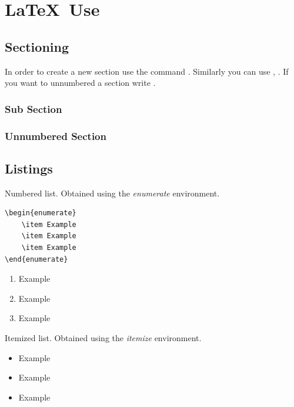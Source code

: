 
\pagestyle{fancy}

\chapter{\LaTeX \, Use}
\label{ch:latex}

\section{Sectioning}
\label{example-Section}

In order to create a new section use the command . Similarly you can use , . If you want to unnumbered a section write . 
\subsection{Sub Section}
\subsection*{Unnumbered Section}

\section{Listings}

Numbered list. Obtained using the \textit{enumerate} environment.
\begin{verbatim}
\begin{enumerate}
	\item Example 
	\item Example 
	\item Example	
\end{enumerate}
\end{verbatim}

\begin{enumerate}
	\item Example 
	\item Example 
	\item Example	
\end{enumerate}

Itemized list. Obtained using the \textit{itemize} environment.
\begin{itemize}
	\item Example
	\item Example
	\item Example	
\end{itemize}


